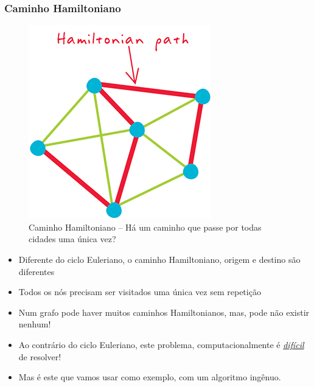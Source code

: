 \begin{frame}[fragile, allowframebreaks=0.9]
  \frametitle{Caminho Hamiltoniano}


\begin{figure}[!htb]
\centering
\includegraphics[width=.6\textwidth, height=0.60\textheight]{figures/hamiltonian_path.jpg}
\caption{Caminho Hamiltoniano -- Há um caminho que passe por todas cidades uma única vez?}
\end{figure}


\framebreak

\begin{itemize}
  \item Diferente do ciclo Euleriano, o caminho Hamiltoniano, origem
  e destino são diferentes
 
\item Todos os nós precisam ser visitados uma única vez sem repetição

\item  Num grafo pode haver muitos caminhos  Hamiltonianos, mas, pode
       não existir nenhum!

\item Ao contrário do ciclo Euleriano, este problema, computacionalmente é \underline{\textit{difícil}} de resolver!

\item Mas é este que vamos usar como exemplo, com um algoritmo  ingênuo.
\end{itemize}

\end{frame}


